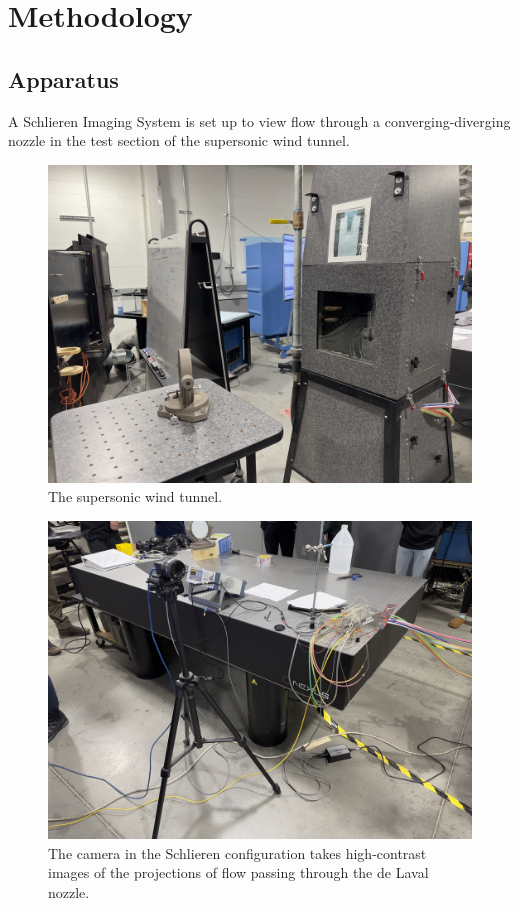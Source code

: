 \chapter{Methodology} \label{cp:methodology}

\section{Apparatus} \label{sec:apparatus}
A Schlieren Imaging System is set up to view flow through a converging-diverging nozzle in the test section of the supersonic wind tunnel. 

\begin{figure}[htpb]
    \centering
    \includegraphics[width=0.75\linewidth]{Figures/back_of_supersonic_wind_tunnel.jpeg}
    \caption{The supersonic wind tunnel.}
    \label{fig:supersonic_wind_tunnel}
\end{figure}

\begin{figure}[htpb]
    \centering
    \includegraphics[width=0.75\linewidth]{Figures/camera.jpeg}
    \caption{The camera in the Schlieren configuration takes high-contrast images of the projections of flow passing through the de Laval nozzle.}
    \label{fig:camera}
\end{figure}

